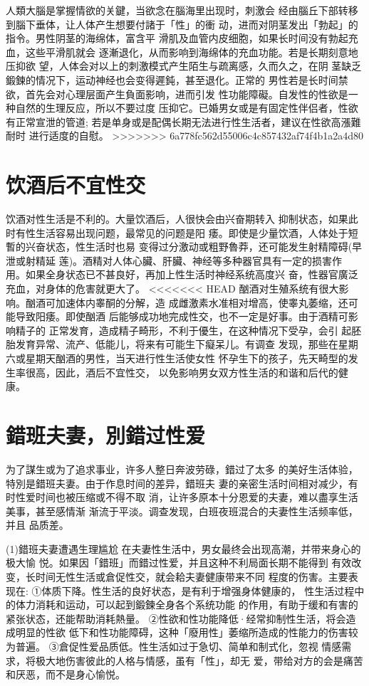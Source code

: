 \documentclass[12pt,UTF8]{ctexbook}
\begin{document}
人類大腦是掌握情欲的关鍵，当欲念在腦海里出现时，刺激会
经由腦丘下部转移到腦下垂体，让人体产生想要付諸于「性」的衝
动，进而对阴茎发出「勃起」的指令。男性阴茎的海绵体，富含平
滑肌及血管内皮细胞，如果长时间没有勃起充血，这些平滑肌就会
逐漸退化，从而影响到海绵体的充血功能。若是长期刻意地压抑欲
望，人体会对以上的刺激模式产生陌生与疏离感，久而久之，在阴
茎缺乏鍛鍊的情况下，运动神经也会变得遲鈍，甚至退化。正常的
男性若是长时间禁欲，首先会对心理层面产生負面影响，进而引发
性功能障礙。自发性的性欲是一种自然的生理反应，所以不要过度
压抑它。已婚男女或是有固定性伴侣者，性欲有正常宣泄的管道;
若是单身或是配偶长期无法进行性生活者，建议在性欲高漲難耐时
进行适度的自慰。
>>>>>>> 6a778fc562d55006c4c857432af74f4b1a2a4d80

\section{饮酒后不宜性交}

饮酒对性生活是不利的。大量饮酒后，人很快会由兴奋期转入
抑制状态，如果此时有性生活容易出现问题，最常见的问题是阳
痿。即使是少量饮酒，人体处于短暫的兴奋状态，性生活时也易
变得过分激动或粗野魯莽，还可能发生射精障碍(早泄或射精延
莲)。酒精对人体心臟、肝臟、神经等多种器官具有一定的损害作
用。如果全身状态已不甚良好，再加上性生活时神经系统高度兴
奋，性器官廣泛充血，对身体的危害就更大了。
<<<<<<< HEAD
酗酒对生殖系统有很大影响。酗酒可加速体内睾酮的分解，造
成雌激素水准相对增高，使睾丸萎缩，还可能导致阳痿。即使酗酒
后能够成功地完成性交，也不一定是好事。由于酒精可影响精子的
正常发育，造成精子畸形，不利于優生，在这种情况下受孕，会引
起胚胎发育异常、流产、低能儿，将来有可能生下癡呆儿。有调查
发现，那些在星期六或星期天酗酒的男性，当天进行性生活使女性
怀孕生下的孩子，先天畸型的发生率很高，因此，酒后不宜性交，
以免影响男女双方性生活的和谐和后代的健康。

\section{錯班夫妻，別錯过性爱}

为了謀生或为了追求事业，许多人整日奔波劳碌，錯过了太多
的美好生活体验，特別是錯班夫妻。由于作息时间的差异，錯班夫
妻的亲密生活时间相对减少，有时性爱时间也被压缩或不得不取
消，让许多原本十分恩爱的夫妻，难以盡享生活美事，甚至感情渐
渐流于平淡。调查发现，白班夜班混合的夫妻性生活频率低，并且
品质差。

(1)錯班夫妻遭遇生理尴尬
在夫妻性生活中，男女最终会出现高潮，并带来身心的极大愉
悦。如果因「錯班」而錯过性爱，并且这种不利局面长期不能得到
有效改变，长时间无性生活或倉促性交，就会耠夫妻健康带来不同
程度的伤害。主要表现在:
①体质下降。性生活的良好状态，是有利于增强身体健康的，
性生活过程中的体力消耗和运动，可以起到鍛鍊全身各个系统功能
的作用，有助于缓和有害的紧张状态，还能帮助消耗熱量。
②性欲和性功能降低·经常抑制性生活，将会造成明显的性欲
低下和性功能障碍，这种「廢用性」萎缩所造成的性能力的伤害较
为普遍。
③倉促性爱品质低。性生活如过于急切、简单和制式化，忽视
情感需求，将极大地伤害彼此的人格与情感，虽有「性」，却无
爱，带给对方的会是痛苦和厌恶，而不是身心愉悦。
\end{document}
